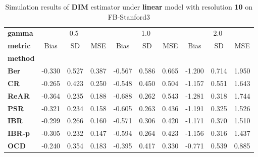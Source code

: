 \begin{table}
\centering
\caption{Simulation results of \textbf{DIM} estimator under \textbf{linear} model with resolution \textbf{10} on FB-Stanford3}
\begin{tabular}{lccccccccc}
\toprule
\textbf{gamma} & \multicolumn{3}{c}{0.5} & \multicolumn{3}{c}{1.0} & \multicolumn{3}{c}{2.0} \\
\textbf{metric} &   Bias &     SD &    MSE &   Bias &     SD &    MSE &   Bias &     SD &    MSE \\
\textbf{method} &        &        &        &        &        &        &        &        &        \\
\midrule
\textbf{Ber} & -0.330 &  0.527 &  0.387 & -0.567 &  0.586 &  0.665 & -1.200 &  0.714 &  1.950 \\
\textbf{CR} & -0.265 &  0.423 &  0.250 & -0.548 &  0.450 &  0.504 & -1.157 &  0.551 &  1.643 \\
\textbf{ReAR} & -0.364 &  0.235 &  0.188 & -0.688 &  0.262 &  0.543 & -1.281 &  0.318 &  1.744 \\
\textbf{PSR} & -0.321 &  0.234 &  0.158 & -0.605 &  0.263 &  0.436 & -1.191 &  0.325 &  1.526 \\
\textbf{IBR} & -0.299 &  0.266 &  0.160 & -0.571 &  0.306 &  0.420 & -1.171 &  0.370 &  1.510 \\
\textbf{IBR-p} & -0.305 &  0.232 &  0.147 & -0.594 &  0.264 &  0.423 & -1.156 &  0.316 &  1.437 \\
\textbf{OCD} & -0.240 &  0.354 &  0.183 & -0.395 &  0.417 &  0.330 & -0.771 &  0.539 &  0.885 \\
\bottomrule
\end{tabular}
\end{table}
